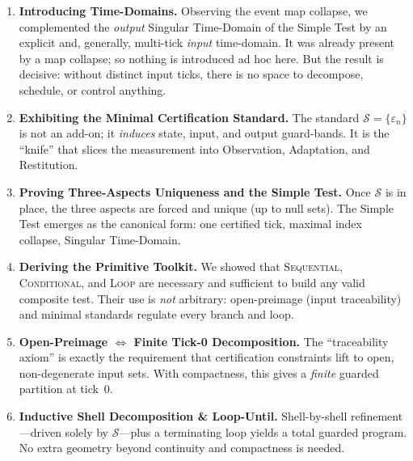 \documentclass[12pt]{article}
\theoremstyle{definition}
\theoremstyle{plain}
\begin{document}
\begin{enumerate}[label=\textbf{C\arabic*}. , leftmargin=2em]
  \item \textbf{Introducing Time-Domains.}  
        Observing the event map collapse, we complemented the \textit{output} Singular Time-Domain of the Simple Test by an explicit and, generally, multi-tick \textit{input} time-domain. It was already present by a map collapse; so nothing is introduced ad hoc here. But the result is decisive: without distinct input ticks, there is no space to decompose, schedule, or control anything.
  \item \textbf{Exhibiting the Minimal Certification Standard.}  
        The standard $\mathcal S=\{\varepsilon_n\}$ is not an add-on; it \emph{induces} state, input, and output guard-bands. It is the “knife” that slices the measurement into Observation, Adaptation, and Restitution.
  \item \textbf{Proving Three-Aspects Uniqueness and the Simple Test.}  
        Once $\mathcal S$ is in place, the three aspects are forced and unique (up to null sets). The Simple Test emerges as the canonical form: one certified tick, maximal index collapse, Singular Time-Domain.
  \item \textbf{Deriving the Primitive Toolkit.}  
        We showed that \textsc{Sequential}, \textsc{Conditional}, and \textsc{Loop} are necessary and sufficient to build any valid composite test.  Their use is \emph{not} arbitrary: open-preimage (input traceability) and minimal standards regulate every branch and loop.
  \item \textbf{Open-Preimage $\Longleftrightarrow$ Finite Tick-0 Decomposition.}  
        The “traceability axiom” is exactly the requirement that certification constraints lift to open, non-degenerate input sets.  With compactness, this gives a \emph{finite} guarded partition at tick~0.
  \item \textbf{Inductive Shell Decomposition \& Loop-Until.}  
        Shell-by-shell refinement—driven solely by $\mathcal S$—plus a terminating loop yields a total guarded program.  No extra geometry beyond continuity and compactness is needed.
    

\end{enumerate}
\end{document}
